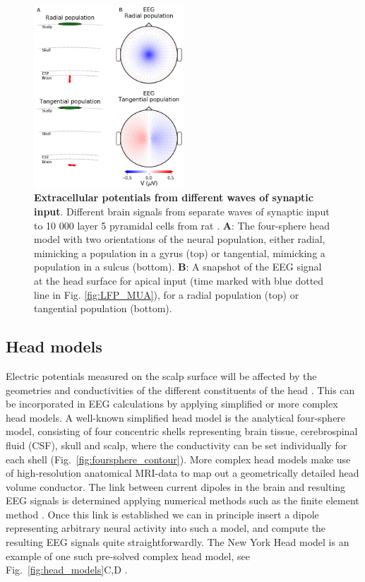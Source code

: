 \documentclass[preprint,11pt,authoryear]{elsarticle}
\begin{document}
\begin{figure}[!ht]
\begin{center}
\includegraphics[width=0.5\textwidth]{population_EEG_MEG_cut.png}
\end{center}
\caption{\textbf{Extracellular potentials from different waves of synaptic input}. Different brain signals from separate waves of synaptic input to 10 000 layer 5 pyramidal cells from rat \citep{Hay2011}.
{\bf A}: The four-sphere head model with two orientations of the neural population, either radial, mimicking a population in a gyrus (top) or tangential, mimicking a population in a sulcus (bottom).
{\bf B}: A snapshot of the EEG signal at the head surface for apical input (time marked with blue dotted line in Fig. \ref{fig:LFP_MUA}), for a radial population (top) or tangential population (bottom).
}
\label{fig:EEG_MEG}
\end{figure}

\subsection{Head models}
Electric potentials measured on the scalp surface will be affected by the geometries and conductivities of the different constituents of the head \citep{Nunez2006}. This can be incorporated in EEG calculations by applying simplified or more complex head models.
A well-known simplified head model is the analytical four-sphere model, consisting of four concentric shells representing brain tissue, cerebrospinal fluid (CSF), skull and scalp, where the conductivity can be set individually for each shell \citep{Naess2017, Srinivasan1998, Nunez2006} (Fig.~\ref{fig:foursphere_contour}).
More complex head models make use of high-resolution anatomical MRI-data to map out a geometrically detailed head volume conductor. The link between current dipoles in the brain and resulting EEG signals is determined applying numerical methods such as the finite element method \citep{Larson2013, Logg2012}. Once this link is established we can in principle insert a dipole representing arbitrary neural activity into such a model, and compute the resulting EEG signals quite straightforwardly. The New York Head model is an example of one such pre-solved complex head model, see Fig.~\ref{fig:head_models}C,D \citep{Huang2016}.
\end{document}

